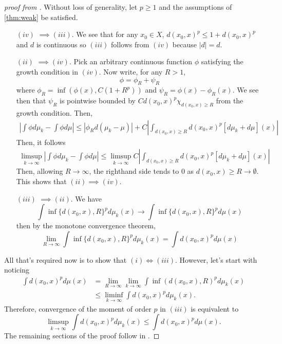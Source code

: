 \documentclass[12pt]{article}
\theoremstyle{plain}
\numberwithin{equation}{section}
\begin{document}
\begin{proof}[proof from \cite{villani}]
  Without loss of generality, let $p\ge 1$ and the assumptions of \autoref{thm:weak} be satisfied.
  \begin{enumerate}
    \item[$(iv)$] $\implies (iii)$. We see that for any $x_0\in X$, $d(x_0,x)^p \le 1+d(x_0,x)^p$ and $d$ is continuous so $(iii)$ follows from $(iv)$ because $|d| = d$.
    \item[$(ii)$] $\implies (iv)$. Pick an arbitrary continuous function $\phi$ satisfying the growth condition in $(iv)$. Now write, for any $R > 1$,
    \[\phi = \phi_R + \psi_R\]
    where $\phi_R = \inf(\phi(x), C(1+R^p))$ and $\psi_R = \phi(x) - \phi_R(x)$. We see then that $\psi_R$ is pointwise bounded by $C d(x_0,x)^p\chi_{d(x_0,x) \ge R}$ from the growth condition. Then, 
    \begin{align*}
      \left|\int \phi d\mu_k - \int \phi d\mu\right| \le \left|\phi_Rd(\mu_k - \mu)\right| + C\left|\int_{d(x_0,x) \ge R}d(x_0,x)^p[d\mu_k + d\mu](x)\right|
    \end{align*}
    Then, it follows 
    \begin{align*}
      \limsup_{k\to\infty}\left|\int \phi d\mu_k - \int \phi d\mu\right| \le \limsup_{k\to\infty}C\left|\int_{d(x_0,x) \ge R}d(x_0,x)^p[d\mu_k + d\mu](x)\right|
    \end{align*}
    Then, allowing $R\to\infty$, the righthand side tends to 0 as $d(x_0,x) \ge R \to \emptyset$. This shows that $(ii)\implies (iv)$.
    \item[$(iii)$] $\implies (ii)$. We have 
    \[\int\inf\{d(x_0,x),R\}^pd\mu_k(x)\to \int \inf\{d(x_0,x),R\}^pd\mu(x)\] 
    then by the monotone convergence theorem,
    \[\lim_{R\to\infty}\int\inf\{d(x_0,x),R\}^pd\mu_k(x)= \int d(x_0,x)^pd\mu(x)\] 
  \end{enumerate}
  All that's required now is to show that $(i)\iff(iii)$. However, let's start with noticing 
  \begin{align*}
    \int d(x_0,x)^pd\mu(x) &= \lim_{R\to\infty}\lim_{k\to\infty} \int\inf(d(x_0,x),R)^pd\mu_k(x) \\
    &\le \liminf_{k\to\infty}\int d(x_0,x)^pd\mu_k(x).
  \end{align*}
  Therefore, convergence of the moment of order $p$ in $(iii)$ is equivalent to 
  \begin{equation}\label{eqn:inequality}
    \limsup_{k\to\infty}\int d(x_0,x)^pd\mu_k(x)\le \int d(x_0,x)^pd\mu(x).
  \end{equation}
  The remaining sections of the proof follow in \cite{villani}.
\end{proof}
\end{document}
